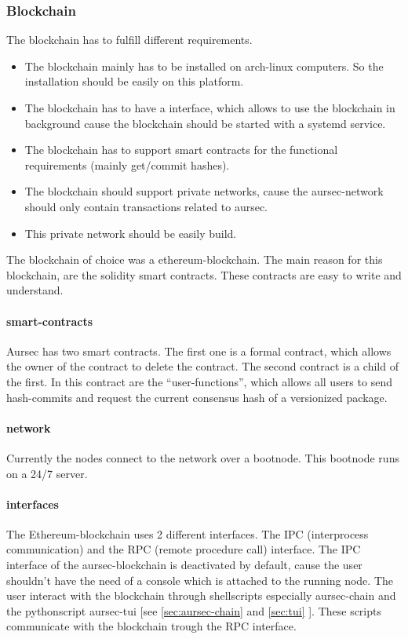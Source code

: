 \subsubsection{Blockchain} \label{sec:blockchain}
The blockchain has to fulfill different requirements.
\begin{itemize}
	\item The blockchain mainly has to be installed on arch-linux computers. So the installation should be easily on this platform.
	\item The blockchain has to have a interface, which allows to use the blockchain in background cause the blockchain should be started with a systemd service.
	\item The blockchain has to support smart contracts for the functional requirements (mainly get/commit hashes).
	\item The blockchain should support private networks, cause the aursec-network should only contain transactions related to aursec.
	\item This private network should be easily build.
\end{itemize}

The blockchain of choice was a ethereum-blockchain. The main reason for this blockchain, are the solidity smart contracts. These contracts are easy to write and understand. 

\paragraph*{smart-contracts}
Aursec has two smart contracts. The first one is a formal contract, which allows the owner of the contract to delete the contract. The second contract is a child of the first. In this contract are the ``user-functions'', which allows all users to send hash-commits and request the current consensus hash of a versionized package. 

\paragraph*{network}
Currently the nodes connect to the network over a bootnode. This bootnode runs on a 24/7 server.

\paragraph*{interfaces}
The Ethereum-blockchain uses 2 different interfaces. The IPC (interprocess communication) and the RPC (remote procedure call) interface. The IPC interface of the aursec-blockchain is deactivated by default, cause the user shouldn't have the need of a console which is attached to the running node. The user interact with the blockchain through shellscripts especially aursec-chain and the pythonscript aursec-tui [see \ref{sec:aursec-chain} and \ref{sec:tui} ]. These scripts communicate with the blockchain trough the RPC interface. 